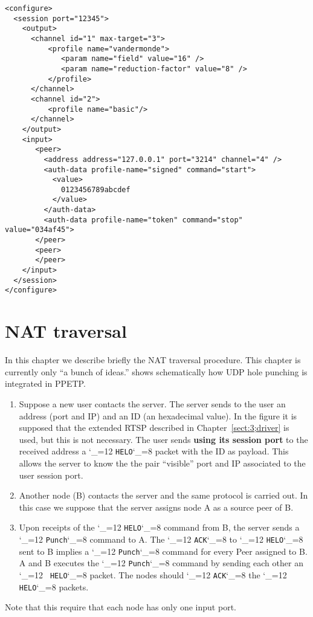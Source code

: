 \documentclass{rfc}
\def\ttt{\catcode`\_=12 \tttii}
\def\tttii#1!{{\tt #1}\catcode`\_=8{}}
\begin{document}
\begin{verbatim}
<configure>
  <session port="12345">
    <output>
      <channel id="1" max-target="3">
          <profile name="vandermonde">
             <param name="field" value="16" />
             <param name="reduction-factor" value="8" />
          </profile>
      </channel>
      <channel id="2">
          <profile name="basic"/>
      </channel>
    </output>
    <input>
       <peer>
         <address address="127.0.0.1" port="3214" channel="4" />
         <auth-data profile-name="signed" command="start">
           <value>
             0123456789abcdef
           </value>
         </auth-data>
         <auth-data profile-name="token" command="stop" value="034af45">
       </peer>
       <peer>
       </peer>
    </input>
  </session>
</configure>
\end{verbatim}

\chapter{NAT traversal}
\label{chap:3;transport_layer}

In this chapter we describe briefly the NAT traversal procedure. This
chapter is currently only ``a bunch of ideas.''  shows
schematically how UDP hole punching is integrated in PPETP.

\begin{enumerate}
  \item Suppose a new user contacts the server.  The server sends to
  the user an address (port and IP) and an ID (an hexadecimal value).
  In the figure it is supposed that the extended RTSP described in
  Chapter~\ref{sect:3;driver} is used, but this is not necessary.  The
  user sends \textbf{using its session port} to the received address a
  \ttt HELO! packet with the ID as payload.  This allows the server to
  know the the pair ``visible'' port and IP associated to the user
  session port.
  \item Another node (B) contacts the server and the same protocol is
  carried out.   In this case we suppose that the server assigns node
  A as a source peer of B.
  \item Upon receipts of the \ttt HELO! command from B, the server
  sends a \ttt Punch! command to A.  The \ttt ACK! to \ttt HELO! sent
  to B implies a \ttt Punch! command for every Peer assigned to B.  A
  and B executes the \ttt Punch! command by sending each other an \ttt
  HELO! packet.  The nodes should \ttt ACK! the \ttt HELO! packets.
\end{enumerate}
%
Note that this require that each node has only one input port.
\end{document}
